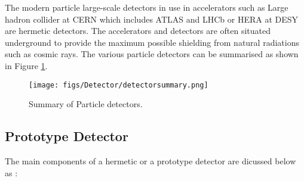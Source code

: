 The modern particle large-scale detectors in use in accelerators such as Large hadron collider at CERN which includes ATLAS and LHCb or HERA at DESY are hermetic detectors. The accelerators and detectors are often situated underground to provide the maximum possible shielding from natural radiations such as cosmic rays. The various particle detectors can be summarised as shown in Figure \ref{summary}.

\begin{figure}[h!]
\begin{center} 
\texttt{[image: figs/Detector/detectorsummary.png]}
\caption{Summary  of Particle detectors.}
\label{summary}
\end{center}
\end{figure} 

\subsection{Prototype Detector}
The main components of a hermetic or a prototype detector are dicussed below as :

